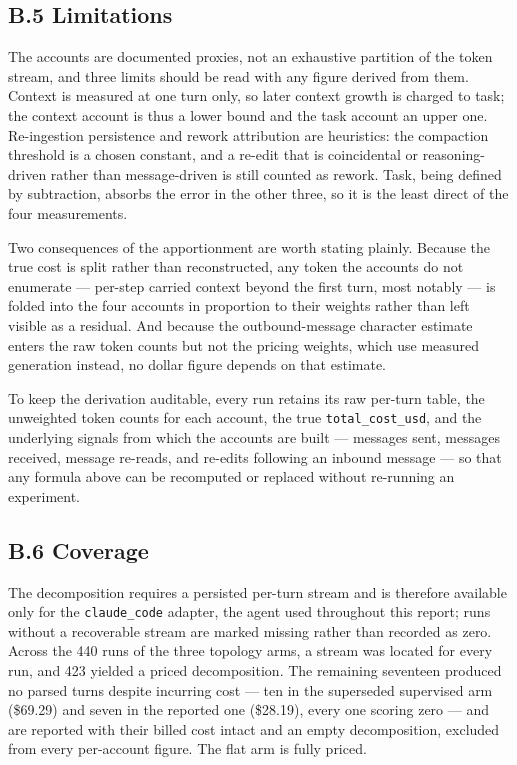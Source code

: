 \documentclass[11pt,a4paper]{article}
\begin{document}
\subsection*{B.5 \quad Limitations}

The accounts are documented proxies, not an exhaustive partition of the token
stream, and three limits should be read with any figure derived from them.
Context is measured at one turn only, so later context growth is charged to task;
the context account is thus a lower bound and the task account an upper one.
Re-ingestion persistence and rework attribution are heuristics: the compaction
threshold is a chosen constant, and a re-edit that is coincidental or
reasoning-driven rather than message-driven is still counted as rework. Task,
being defined by subtraction, absorbs the error in the other three, so it is the
least direct of the four measurements.

Two consequences of the apportionment are worth stating plainly. Because the true
cost is split rather than reconstructed, any token the accounts do not enumerate
--- per-step carried context beyond the first turn, most notably --- is folded
into the four accounts in proportion to their weights rather than left visible as
a residual. And because the outbound-message character estimate enters the raw
token counts but not the pricing weights, which use measured generation instead,
no dollar figure depends on that estimate.

To keep the derivation auditable, every run retains its raw per-turn table, the
unweighted token counts for each account, the true \texttt{total\_cost\_usd}, and
the underlying signals from which the accounts are built --- messages sent,
messages received, message re-reads, and re-edits following an inbound message ---
so that any formula above can be recomputed or replaced without re-running an
experiment.

\subsection*{B.6 \quad Coverage}

The decomposition requires a persisted per-turn stream and is therefore available
only for the \texttt{claude\_code} adapter, the agent used throughout this report;
runs without a recoverable stream are marked missing rather than recorded as zero.
Across the 440 runs of the three topology arms, a stream was located for every
run, and 423 yielded a priced decomposition. The remaining seventeen produced no
parsed turns despite incurring cost --- ten in the superseded supervised arm
(\$69.29) and seven in the reported one (\$28.19), every one scoring zero ---
and are reported with their billed cost intact and an empty decomposition,
excluded from every per-account figure. The flat arm is fully priced.

\end{document}
